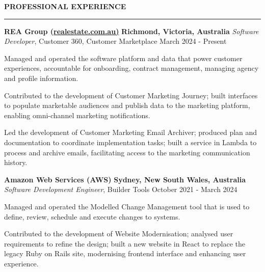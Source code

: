 \documentclass{cv}
\begin{document}
\textbf{\uppercase{Professional Experience}}
\sectionlineskip
\hrule height 0.6pt
\begin{list}{}{\setlength{\leftmargin}{0pt}}
\itemsep 2.0pt
\item
    \textbf{REA Group (\href{https://realestate.com.au/}{realestate.com.au)}} \hfill \textbf{Richmond, Victoria, Australia}%
    \vspace{1.0pt} \newline 
    {\textit{Software Developer}, Customer 360, Customer Marketplace} \hfill {March 2024 - Present}%
    \begin{list}{\raisebox{2.0pt}{\tiny$\bullet$}\space}{\setlength{\leftmargin}{11.2pt}}
        \itemsep -4.0pt \vspace{-4.0pt}
        \item Managed and operated the software platform and data that power customer experiences, accountable for onboarding, contract management, managing agency and profile information.
        \item Contributed to the development of Customer Marketing Journey; built interfaces to populate marketable audiences and publish data to the marketing platform, enabling omni-channel marketing notifications.
        \item Led the development of Customer Marketing Email Archiver; produced plan and documentation to coordinate implementation tasks; built a service in Lambda to process and archive emails, facilitating access to the marketing communication history.
    \end{list}
\item 
    \textbf{Amazon Web Services (AWS)} \hfill \textbf{Sydney, New South Wales, Australia}%
    \vspace{1.0pt} \newline 
    {\textit{Software Development Engineer}, Builder Tools} \hfill {October 2021 - March 2024}%
    \begin{list}{\raisebox{2.0pt}{\tiny$\bullet$}\space}{\setlength{\leftmargin}{11.2pt}}
        \itemsep -4.0pt \vspace{-4.0pt}
        \item Managed and operated the Modelled Change Management tool that is used to define, review, schedule and execute changes to systems.
        \item Contributed to the development of Website Modernisation; analysed user requirements to refine the design; built a new website in React to replace the legacy Ruby on Rails site, modernising frontend interface and enhancing user experience.

\end{list}
\end{list}
\end{document}
